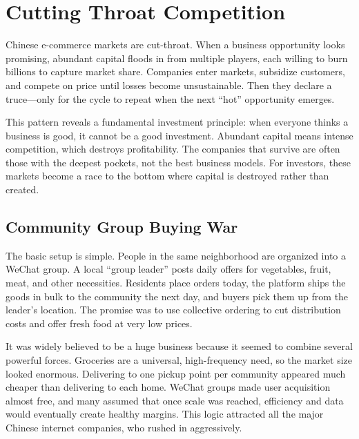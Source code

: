 \chapter{Cutting Throat Competition}

\nocite{cnbc_2025_pricewar}
\nocite{howtheybegan_meituan}
\nocite{deliverywar_2013}
\nocite{cnbc_2025_pricewar}

Chinese e-commerce markets are cut-throat. When a business opportunity looks promising, abundant capital floods in from multiple players, each willing to burn billions to capture market share. Companies enter markets, subsidize customers, and compete on price until losses become unsustainable. Then they declare a truce—only for the cycle to repeat when the next ``hot'' opportunity emerges.

This pattern reveals a fundamental investment principle: when everyone thinks a business is good, it cannot be a good investment. Abundant capital means intense competition, which destroys profitability. The companies that survive are often those with the deepest pockets, not the best business models. For investors, these markets become a race to the bottom where capital is destroyed rather than created.


\section{Community Group Buying War}
The basic setup is simple. People in the same neighborhood are organized into a WeChat group. A local ``group leader'' posts daily offers for vegetables, fruit, meat, and other necessities. Residents place orders today, the platform ships the goods in bulk to the community the next day, and buyers pick them up from the leader's location. The promise was to use collective ordering to cut distribution costs and offer fresh food at very low prices.

It was widely believed to be a huge business because it seemed to combine several powerful forces. Groceries are a universal, high-frequency need, so the market size looked enormous. Delivering to one pickup point per community appeared much cheaper than delivering to each home. WeChat groups made user acquisition almost free, and many assumed that once scale was reached, efficiency and data would eventually create healthy margins. This logic attracted all the major Chinese internet companies, who rushed in aggressively.


